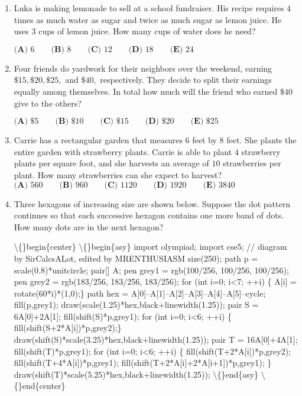 \documentclass{article}
\begin{document}
\begin{enumerate}[label=\arabic*., itemsep=0.5em]\item Luka is making lemonade to sell at a school fundraiser. His recipe requires \(4\) times as much water as sugar and twice as much sugar as lemon juice. He uses \(3\) cups of lemon juice. How many cups of water does he need? 

\(\textbf{(A) } 6\qquad\textbf{(B) } 8\qquad\textbf{(C) } 12\qquad\textbf{(D) } 18\qquad\textbf{(E) } 24\qquad\)\par \vspace{0.5em}\item Four friends do yardwork for their neighbors over the weekend, earning \(\$15, \$20, \$25,\) and \(\$40,\) respectively. They decide to split their earnings equally among themselves. In total how much will the friend who earned \(\$40\) give to the others?

\(\textbf{(A) }\$5 \qquad \textbf{(B) }\$10 \qquad \textbf{(C) }\$15 \qquad \textbf{(D) }\$20 \qquad \textbf{(E) }\$25\)\par \vspace{0.5em}\item Carrie has a rectangular garden that measures \(6\) feet by \(8\) feet. She plants the entire garden with strawberry plants. Carrie is able to plant \(4\) strawberry plants per square foot, and she harvests an average of \(10\) strawberries per plant. How many strawberries can she expect to harvest?
\(\textbf{(A) }560 \qquad \textbf{(B) }960 \qquad \textbf{(C) }1120 \qquad \textbf{(D) }1920 \qquad \textbf{(E) }3840\)\par \vspace{0.5em}\item Three hexagons of increasing size are shown below. Suppose the dot pattern continues so that each successive hexagon contains one more band of dots. How many dots are in the next hexagon?


\textbackslash\{\}begin\{center\}
\textbackslash\{\}begin\{asy\}
import olympiad;
import cse5;
// diagram by SirCalcsALot, edited by MRENTHUSIASM
size(250);
path p = scale(0.8)*unitcircle;
pair[] A;
pen grey1 = rgb(100/256, 100/256, 100/256);
pen grey2 = rgb(183/256, 183/256, 183/256);
for (int i=0; i<7; ++i) \{ A[i] = rotate(60*i)*(1,0);\}
path hex = A[0]--A[1]--A[2]--A[3]--A[4]--A[5]--cycle;
fill(p,grey1);
draw(scale(1.25)*hex,black+linewidth(1.25));
pair S = 6A[0]+2A[1];
fill(shift(S)*p,grey1);
for (int i=0; i<6; ++i) \{ fill(shift(S+2*A[i])*p,grey2);\}
draw(shift(S)*scale(3.25)*hex,black+linewidth(1.25));
pair T = 16A[0]+4A[1];
fill(shift(T)*p,grey1);
for (int i=0; i<6; ++i) \{ 
 fill(shift(T+2*A[i])*p,grey2);
 fill(shift(T+4*A[i])*p,grey1);
 fill(shift(T+2*A[i]+2*A[i+1])*p,grey1);
\}
draw(shift(T)*scale(5.25)*hex,black+linewidth(1.25));
\textbackslash\{\}end\{asy\}
\textbackslash\{\}end\{center\}



\end{enumerate}
\end{document}
